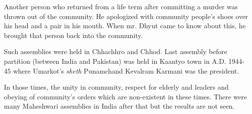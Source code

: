 Another person who returned from a life term after committing a murder was
thrown out of the community. He apologized with community people's shoes over
his head and a pair in his mouth. When mr. Dhyut came to know about this, he
brought that person back into the community.

Such assemblies were held in Chhachhro and Chhod. Last assembly before
partition (between India and Pakistan) was held in Kaantyo town in A.D. 1944-45
where Umarkot's \textit{sheth} Punamchand Kevalram Karmani was the president.

In those times, the unity in community, respect for elderly and leaders and
obeying of community's orders which are non-existent in these times. There were
many Maheshwari assemblies in India after that but the results are not seen.
